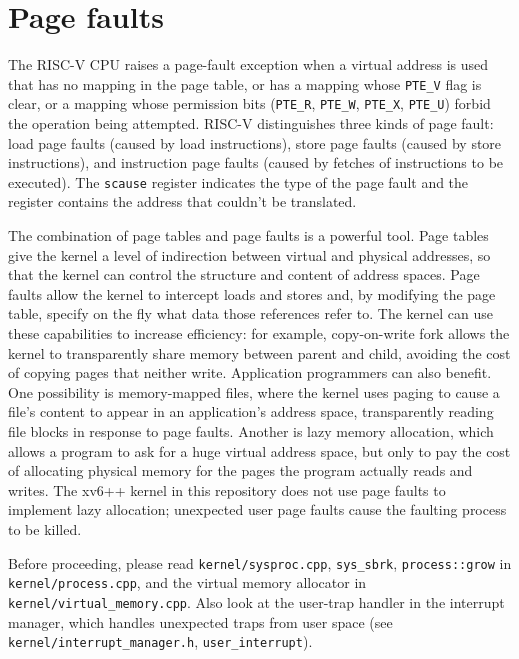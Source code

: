 \chapter{Page faults}
\label{CH:PGFAULTS}

The RISC-V CPU raises a page-fault exception
when a virtual address is used that has no mapping
in the page table, or has a mapping whose \lstinline{PTE_V}
flag is clear, or a mapping whose permission bits
(\lstinline{PTE_R},
\lstinline{PTE_W},
\lstinline{PTE_X},
\lstinline{PTE_U})
forbid the operation being attempted.
RISC-V distinguishes three
kinds of page fault: load page faults (caused by load instructions),
store page faults (caused by store instructions),
and instruction
page faults (caused by fetches of instructions to be executed).  The
\lstinline{scause} register indicates the type of the
page fault and the  register contains the address
that couldn't be translated.

The combination of page tables and page faults is a powerful tool.
Page tables give the kernel a level of indirection between virtual and
physical addresses, so that the kernel can control the structure and
content of address spaces. Page faults allow the kernel to intercept
loads and stores and, by modifying the page table, specify on the fly
what data those references refer to. The kernel can use these
capabilities to increase efficiency: for example, copy-on-write fork
allows the kernel to transparently share memory between parent and
child, avoiding the cost of copying pages that neither write.
Application programmers can also benefit. One possibility is
memory-mapped files, where the kernel uses paging to cause a file's
content to appear in an application's address space, transparently
reading file blocks in response to page faults. Another is lazy memory
allocation, which allows a program to ask for a huge virtual
address space, but only to pay the cost of allocating physical memory
for the pages the program actually reads and writes. The xv6++ kernel
in this repository does not use page faults to implement lazy allocation;
unexpected user page faults cause the faulting process to be killed.

Before proceeding, please read \texttt{kernel/sysproc.cpp},
\texttt{sys\_sbrk}, \texttt{process::grow} in \texttt{kernel/process.cpp},
and the virtual memory allocator in \texttt{kernel/virtual\_memory.cpp}.
Also look at the user-trap handler in the interrupt manager, which handles
unexpected traps from user space
(see \texttt{kernel/interrupt\_manager.h}, \texttt{user\_interrupt}).


